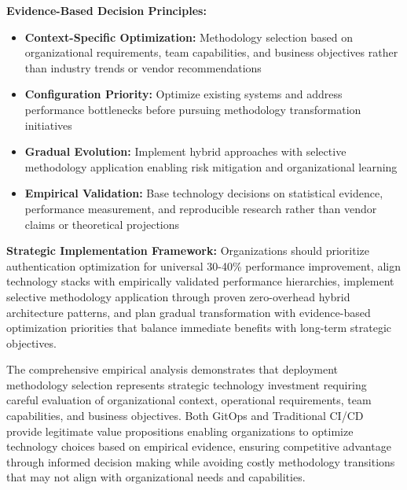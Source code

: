 \textbf{Evidence-Based Decision Principles:}
\begin{itemize}
\item \textbf{Context-Specific Optimization:} Methodology selection based on organizational requirements, team capabilities, and business objectives rather than industry trends or vendor recommendations
\item \textbf{Configuration Priority:} Optimize existing systems and address performance bottlenecks before pursuing methodology transformation initiatives
\item \textbf{Gradual Evolution:} Implement hybrid approaches with selective methodology application enabling risk mitigation and organizational learning
\item \textbf{Empirical Validation:} Base technology decisions on statistical evidence, performance measurement, and reproducible research rather than vendor claims or theoretical projections
\end{itemize}

\textbf{Strategic Implementation Framework:}
Organizations should prioritize authentication optimization for universal 30-40\% performance improvement, align technology stacks with empirically validated performance hierarchies, implement selective methodology application through proven zero-overhead hybrid architecture patterns, and plan gradual transformation with evidence-based optimization priorities that balance immediate benefits with long-term strategic objectives.

The comprehensive empirical analysis demonstrates that deployment methodology selection represents strategic technology investment requiring careful evaluation of organizational context, operational requirements, team capabilities, and business objectives. Both GitOps and Traditional CI/CD provide legitimate value propositions enabling organizations to optimize technology choices based on empirical evidence, ensuring competitive advantage through informed decision making while avoiding costly methodology transitions that may not align with organizational needs and capabilities.